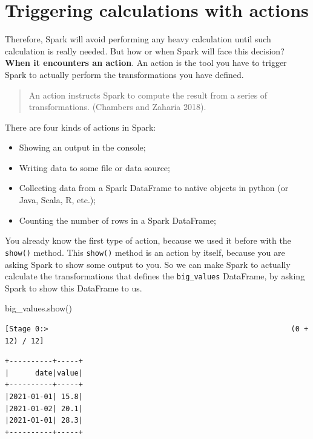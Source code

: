 \documentclass[
  11pt,
  letterpaper,
  DIV=11,
  numbers=noendperiod]{scrreprt}
\newenvironment{Shaded}{\begin{snugshade}}{\end{snugshade}}
\newcommand{\NormalTok}[1]{\textcolor[rgb]{0.00,0.23,0.31}{#1}}
\providecommand{\tightlist}{%
  \setlength{\itemsep}{0pt}\setlength{\parskip}{0pt}}\usepackage{longtable,booktabs,array}
\begin{document}
\hypertarget{sec-dataframe-actions}{%
\section{Triggering calculations with
actions}\label{sec-dataframe-actions}}

Therefore, Spark will avoid performing any heavy calculation until such
calculation is really needed. But how or when Spark will face this
decision? \textbf{When it encounters an action}. An action is the tool
you have to trigger Spark to actually perform the transformations you
have defined.

\begin{quote}
An action instructs Spark to compute the result from a series of
transformations. (Chambers and Zaharia 2018).
\end{quote}

There are four kinds of actions in Spark:

\begin{itemize}
\tightlist
\item
  Showing an output in the console;
\item
  Writing data to some file or data source;
\item
  Collecting data from a Spark DataFrame to native objects in python (or
  Java, Scala, R, etc.);
\item
  Counting the number of rows in a Spark DataFrame;
\end{itemize}

You already know the first type of action, because we used it before
with the \texttt{show()} method. This \texttt{show()} method is an
action by itself, because you are asking Spark to show some output to
you. So we can make Spark to actually calculate the transformations that
defines the \texttt{big\_values} DataFrame, by asking Spark to show this
DataFrame to us.

\begin{Shaded}
\begin{Highlighting}[]
\NormalTok{big\_values.show()}
\end{Highlighting}
\end{Shaded}

\begin{verbatim}
[Stage 0:>                                                        (0 + 12) / 12]
\end{verbatim}

\begin{verbatim}
+----------+-----+
|      date|value|
+----------+-----+
|2021-01-01| 15.8|
|2021-01-02| 20.1|
|2021-01-01| 28.3|
+----------+-----+
\end{verbatim}
\end{document}
